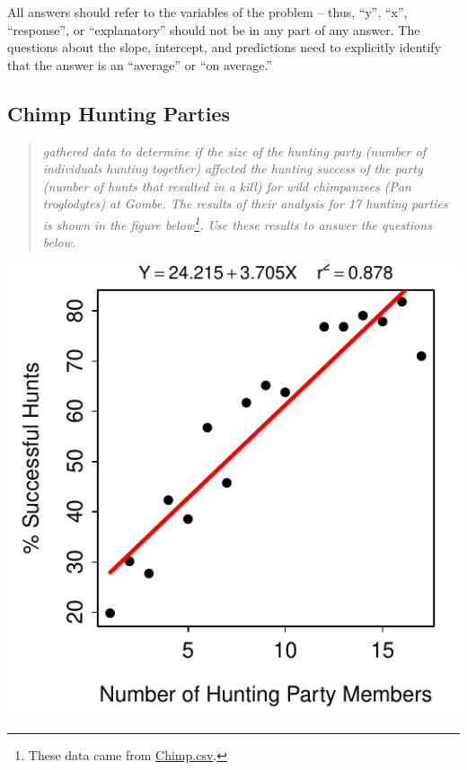 \documentclass[10pt,openany]{book}\usepackage[]{graphicx}\usepackage[]{color}
\newenvironment{knitrout}{}{} %
\begin{document}
All answers should refer to the variables of the problem -- thus, ``y'', ``x'', ``response'', or ``explanatory'' should not be in any part of any answer.  The questions about the slope, intercept, and predictions need to explicitly identify that the answer is an ``average'' or ``on average.''

\subsection*{Chimp Hunting Parties}
\begin{quote}
\textit{\cite{Stanford1996} gathered data to determine if the size of the hunting party (number of individuals hunting together) affected the hunting success of the party (number of hunts that resulted in a kill) for wild chimpanzees (Pan troglodytes) at Gombe.  The results of their analysis for 17 hunting parties is shown in the figure below\footnote{These data came from \href{https://raw.githubusercontent.com/droglenc/NCData/master/Chimp.csv}{Chimp.csv}.}.  Use these results to answer the questions below.}
\end{quote}

\begin{knitrout}
\color{fgcolor}

{\centering \includegraphics[width=.4\linewidth]{Figs/ChimpFLP-1} 

}



\end{knitrout}
\end{document}
